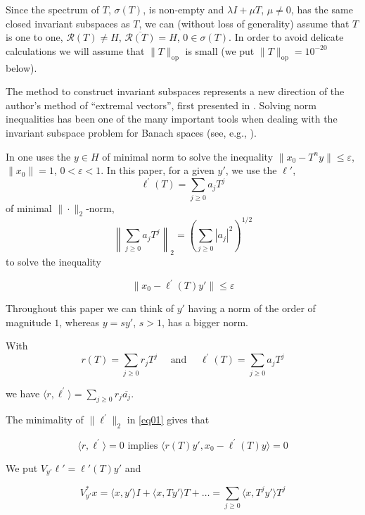 \documentclass[12pt,oneside,reqno]{amsart}
\theoremstyle{definition}
\begin{document}
Since the spectrum of $T$, $\sigma (T)$, is non-empty and $\lambda I + \mu T$, $\mu \neq 0$, has the same closed invariant subspaces as $T$, we can (without loss of generality) assume that $T$ is one to one, $\mathcal{R}(T)  \neq H$, $\overline{\mathcal{R}(T)}=H$, $0 \in \sigma (T)$. In order to avoid delicate calculations we will assume that $\|T\|_{\text{op}}$ is small (we put $\|T\|_{\text{op}} = 10^{-20}$ below). 

The method to construct invariant subspaces represents a new direction of the author's method of ``extremal vectors'', first presented in \cite{AnsariEnflo}. Solving norm inequalities has been one of the many important tools when dealing with the invariant subspace problem for Banach spaces (see, e.g., \cite{enflo1987, MR4093902, BBEM}).  

In \cite{AnsariEnflo} one uses the $y \in H$ of minimal norm to solve the inequality $\|x_0 - T^n y\| \le \varepsilon$, $\|x_0\| = 1$, $0 < \varepsilon < 1.$ In this paper, for a given $y'$, we use the $\ell '$, 
$$\ell^\prime (T) = \sum_{j \ge 0} a_j T^j$$
of minimal $\|\cdot \|_2$-norm,
$$\left\| \sum_{j \ge 0} a_j T^j\right\|_2 = \left( \sum_{j \ge 0} |a_j|^2\right)^{1/2}$$
to solve the inequality 

\begin{equation}\label{eq01}
	\|x_0 - \ell^\prime (T) y' \| \le \varepsilon
\end{equation}

Throughout this paper we can think of $y'$ having a norm of the order of magnitude $1$, whereas $y = s y'$, $s>1$, has a bigger norm.

With 
$$r(T) = \sum_{j \ge 0} r_j T^j \quad \text{ and } \quad \ell^\prime (T) = \sum_{j\ge 0} a_j T^j$$

we have $\displaystyle \langle r, \ell^\prime \rangle = \sum_{j \ge 0} r_j \overline{a_j}$.

The minimality of $\|\ell^\prime\|_2$ in \eqref{eq01} gives that

\begin{equation}\label{eq02}
\displaystyle \langle r, \ell^\prime \rangle = 0 \text{ implies } \langle r(T) y', x_0 - \ell^\prime (T) y\rangle = 0
\end{equation}

We put $V_{y'} \ell' = \ell'(T) y'$ and

\begin{equation}\label{eq03}
V^{*}_{y'} x = \langle x, y' \rangle I + \langle x, T y'\rangle T + \ldots = \sum_{j \ge 0} \langle x, T^{j} y'\rangle T^j
\end{equation}
\end{document}
